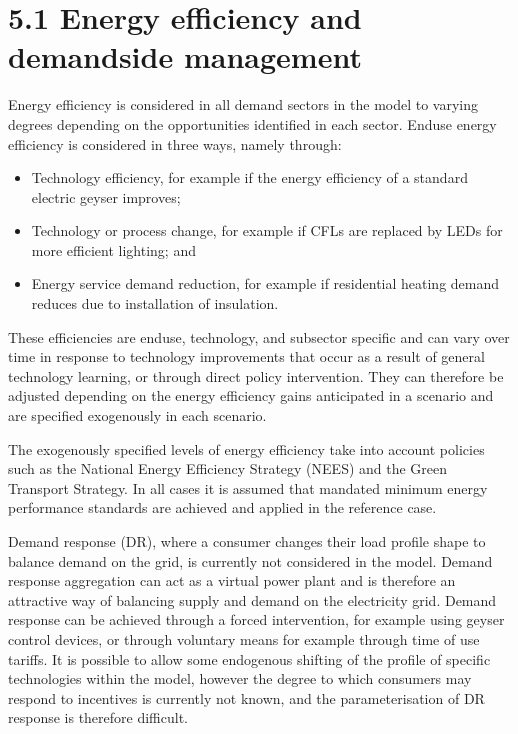 \documentclass[letterpaper,10pt,english]{jupyterBook}
\begin{document}
\section{5.1 Energy efficiency and demand\sphinxhyphen{}side management}
\label{\detokenize{05Crosscuttingindustries:energy-efficiency-and-demand-side-management}}
\sphinxAtStartPar
Energy efficiency is considered in all demand sectors in the model to varying degrees depending on the opportunities identified in each sector. End\sphinxhyphen{}use energy efficiency is considered in three ways, namely through:
\begin{itemize}
\item {} 
\sphinxAtStartPar
Technology efficiency, for example if the energy efficiency of a standard electric geyser improves;

\item {} 
\sphinxAtStartPar
Technology or process change, for example if CFLs are replaced by LEDs for more efficient lighting; and

\item {} 
\sphinxAtStartPar
Energy service demand reduction, for example if residential heating demand reduces due to installation of insulation.

\end{itemize}

\sphinxAtStartPar
{} These efficiencies are end\sphinxhyphen{}use, technology, and sub\sphinxhyphen{}sector specific and can vary over time in response to technology improvements that occur as a result of general technology learning, or through direct policy intervention. They can therefore be adjusted depending on the energy efficiency gains anticipated in a scenario and are specified exogenously in each scenario.

\sphinxAtStartPar
The exogenously specified levels of energy efficiency take into account policies such as the National Energy Efficiency Strategy (NEES) and the Green Transport Strategy. In all cases it is assumed that mandated minimum energy performance standards are achieved and applied in the reference case.

\sphinxAtStartPar
Demand response (DR), where a consumer changes their load profile shape to balance demand on the grid, is currently not considered in the model. Demand response aggregation can act as a virtual power plant and is therefore an attractive way of balancing supply and demand on the electricity grid. Demand response can be achieved through a forced intervention, for example using geyser control devices, or through voluntary means for example through time of use tariffs. It is possible to allow some endogenous shifting of the profile of specific technologies within the model, however the degree to which consumers may respond to incentives is currently not known, and the parameterisation of DR response is therefore difficult.
\end{document}

